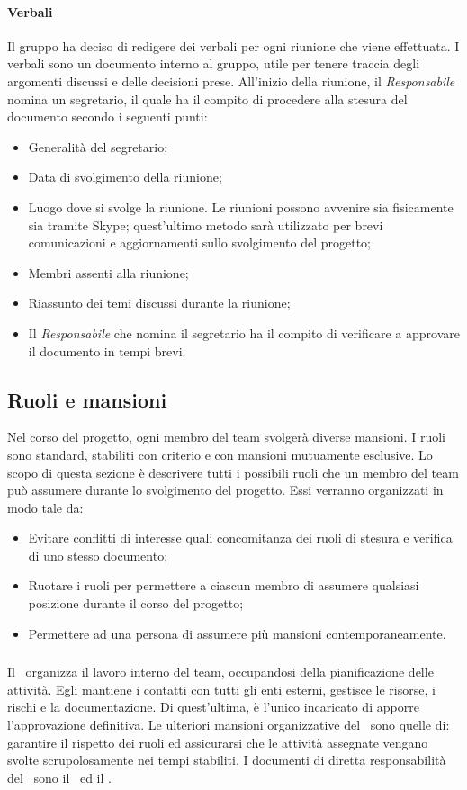 			\paragraph{Verbali}
			Il gruppo ha deciso di redigere dei verbali per ogni riunione che viene effettuata. I verbali sono un documento interno al gruppo, utile per tenere traccia degli argomenti discussi e delle decisioni prese. All'inizio della riunione, il \textit{Responsabile} nomina un segretario, il quale ha il compito di procedere alla stesura del documento secondo i seguenti punti:
			\begin{itemize}
				\item Generalità del segretario;
				\item Data di svolgimento della riunione;
				\item Luogo dove si svolge la riunione. Le riunioni possono avvenire sia fisicamente sia tramite Skype; quest'ultimo metodo sarà utilizzato per brevi comunicazioni e aggiornamenti sullo svolgimento del progetto;
				\item Membri assenti alla riunione;
				\item Riassunto dei temi discussi durante la riunione;
				\item Il \textit{Responsabile} che nomina il segretario ha il compito di verificare a approvare il documento in tempi brevi.
			\end{itemize}

	\subsection{Ruoli e mansioni}
	Nel corso del progetto, ogni membro del team svolgerà diverse mansioni. I ruoli sono standard, stabiliti con criterio e con mansioni mutuamente esclusive. Lo scopo di questa sezione è descrivere tutti i possibili ruoli che un membro del team può assumere durante lo svolgimento del progetto. Essi verranno organizzati in modo tale da:
	\begin{itemize}
		\item Evitare conflitti di interesse quali concomitanza dei ruoli di stesura e verifica di uno stesso documento;
		\item Ruotare i ruoli per permettere a ciascun membro di assumere qualsiasi posizione durante il corso del progetto;
		\item Permettere ad una persona di assumere più mansioni contemporaneamente.
	\end{itemize}

		\subsubsection{\RdP}
		Il \RdP\ organizza il lavoro interno del team, occupandosi della pianificazione delle attività. Egli mantiene i contatti con tutti gli enti esterni, gestisce le risorse, i rischi e la documentazione. Di quest'ultima, è l'unico incaricato di apporre l'approvazione definitiva. Le ulteriori mansioni organizzative del \RdP\ sono quelle di: garantire il rispetto dei ruoli ed assicurarsi che le attività assegnate vengano svolte scrupolosamente nei tempi stabiliti. I documenti di diretta responsabilità del \RdP\ sono il \PdP\ ed il \PdQ.


